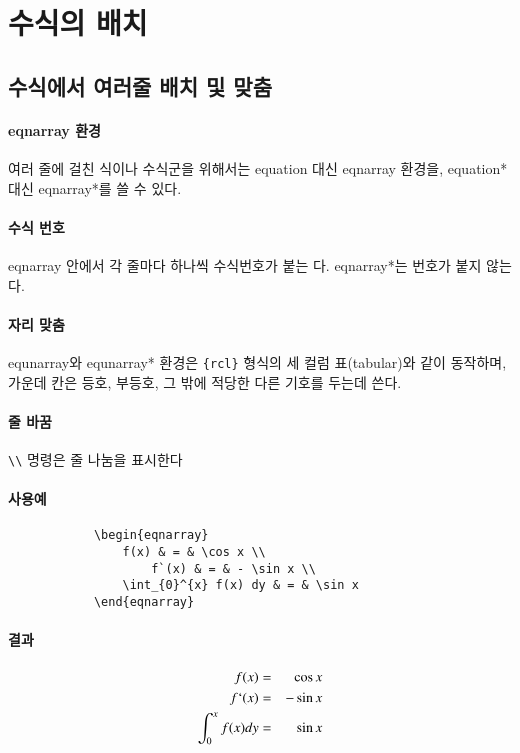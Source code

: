 	
%
%
%
\clearpage
\section{수식의 배치}


	\subsection{수식에서 여러줄 배치 및 맞춤}
		\paragraph{eqnarray 환경}
		여러 줄에 걸친 식이나 수식군을 위해서는 equation  대신 eqnarray 환경을, equation* 대신 eqnarray*를 쓸 수 있다.
		
		\paragraph{수식 번호}
		eqnarray 안에서 각 줄마다 하나씩 수식번호가 붙는 다. eqnarray*는 번호가 붙지 않는다.
		
		\paragraph{자리 맞춤}
		equnarray와 equnarray* 환경은 \verb|{rcl}| 형식의 세 컬럼 표(tabular)와 같이 동작하며,
		가운데 칸은 등호, 부등호, 그 밖에 적당한 다른 기호를 두는데 쓴다.

		\paragraph{줄 바꿈}
		\verb|\\| 명령은 줄 나눔을 표시한다

		\clearpage
		\paragraph{사용예}
		\begin{verbatim}
			\begin{eqnarray}
			    f(x) & = & \cos x \\
    			    f`(x) & = & - \sin x \\
			    \int_{0}^{x} f(x) dy & = & \sin x 
			\end{eqnarray}
		\end{verbatim}
		\paragraph{결과}
		\begin{eqnarray}
			f(x) & = & \cos x \\
			f`(x) & = & - \sin x \\
			\int_{0}^{x} f(x) dy & = & \sin x 
		\end{eqnarray}
		
